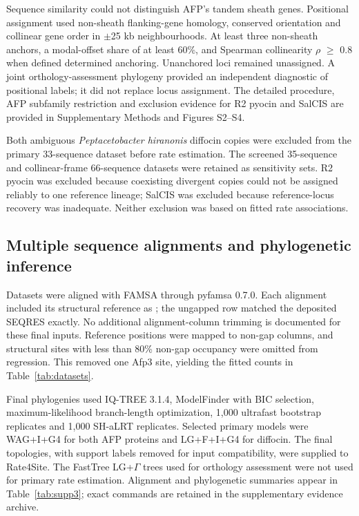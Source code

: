 \documentclass[11pt,a4paper]{article}
\begin{document}
Sequence similarity could not distinguish AFP's tandem sheath genes. Positional assignment used non-sheath flanking-gene homology, conserved orientation and collinear gene order in \ensuremath{\pm}25 kb neighbourhoods. At least three non-sheath anchors, a modal-offset share of at least 60\%, and Spearman collinearity \ensuremath{\rho} \ensuremath{\geq} 0.8 when defined determined anchoring. Unanchored loci remained unassigned. A joint orthology-assessment phylogeny provided an independent diagnostic of positional labels; it did not replace locus assignment. The detailed procedure, AFP subfamily restriction and exclusion evidence for R2 pyocin and SalCIS are provided in Supplementary Methods and Figures S2--S4.

Both ambiguous \emph{Peptacetobacter hiranonis} diffocin copies were excluded from the primary 33-sequence dataset before rate estimation. The screened 35-sequence and collinear-frame 66-sequence datasets were retained as sensitivity sets. R2 pyocin was excluded because coexisting divergent copies could not be assigned reliably to one reference lineage; SalCIS was excluded because reference-locus recovery was inadequate. Neither exclusion was based on fitted rate associations.

\subsection{Multiple sequence alignments and phylogenetic inference}

Datasets were aligned with FAMSA through pyfamsa 0.7.0.\cite{ref13} Each alignment included its structural reference as ; the ungapped row matched the deposited SEQRES exactly. No additional alignment-column trimming is documented for these final inputs. Reference positions were mapped to non-gap  columns, and structural sites with less than 80\% non-gap occupancy were omitted from regression. This removed one Afp3 site, yielding the fitted counts in Table~\ref{tab:datasets}.

Final phylogenies used IQ-TREE 3.1.4,\cite{ref14} ModelFinder with BIC selection,\cite{ref15} maximum-likelihood branch-length optimization, 1,000 ultrafast bootstrap replicates\cite{ref16} and 1,000 SH-aLRT replicates.\cite{ref17} Selected primary models were WAG+I+G4 for both AFP proteins and LG+F+I+G4 for diffocin. The final topologies, with support labels removed for input compatibility, were supplied to Rate4Site. The FastTree LG+\ensuremath{\Gamma} trees used for orthology assessment were not used for primary rate estimation. Alignment and phylogenetic summaries appear in Table~\ref{tab:supp3}; exact commands are retained in the supplementary evidence archive.
\end{document}
